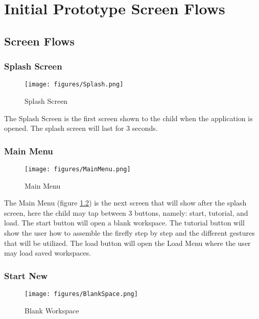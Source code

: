 \chapter{Initial Prototype Screen Flows}
\label{sec:appendixf}


\section{Screen Flows}


\subsection{Splash Screen}

\begin{figure}[H]
    \centering
    \texttt{[image: figures/Splash.png]}
    \caption{Splash Screen}
    \label{fig:splash}
\end{figure}

The Splash Screen is the first screen shown to the child when the application is opened. The splash screen will last for 3 seconds.

\subsection{Main Menu}

\begin{figure}[H]
    \centering
    \texttt{[image: figures/MainMenu.png]}
    \caption{Main Menu}
    \label{fig:mainmenu}
\end{figure}

The Main Menu (figure \ref{fig:mainmenu}) is the next screen that will show after the splash screen, here the child may tap between 3 buttons, namely: start, tutorial, and load. The start button will open a blank workspace. The tutorial button will show the user how to assemble the firefly step by step and the different gestures that will be utilized. The load button will open the Load Menu where the user may load saved workspaces.

\subsection{Start New}

\begin{figure}[H]
    \centering
    \texttt{[image: figures/BlankSpace.png]}
    \caption{Blank Workspace}
    \label{fig:blankworkspace}
\end{figure}

